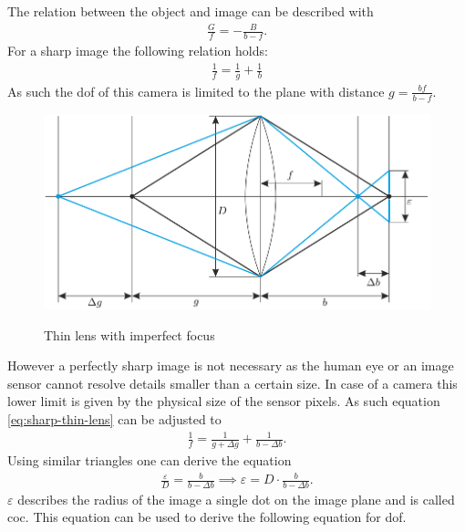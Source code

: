 The relation between the object and image can be described with
\begin{align}
    \frac{G}{f} = - \frac{B}{b-f}.
\end{align}
For a sharp image the following relation holds:
\begin{align}
    \frac{1}{f} = \frac{1}{g} + \frac{1}{b}
    \label{eq:sharp-thin-lens}
\end{align}
As such the \gls{dof} of this camera is limited to the plane with distance $g = \frac{bf}{b-f}$.
\begin{figure}[h]
    \centering
    \includegraphics[width=\textwidth]{images/coc.png}
    \caption{Thin lens with imperfect focus}
    \label{fig:coc-thin-lens}
    \cite{Beyerer.2016}
\end{figure}
However a perfectly sharp image is not necessary as the human eye or an image sensor cannot resolve details smaller than a certain size.
In case of a camera this lower limit is given by the physical size of the sensor pixels.
As such equation \ref{eq:sharp-thin-lens} can be adjusted to
\begin{align}
    \frac{1}{f} = \frac{1}{g + \Delta g} + \frac{1}{b - \Delta b}.
\end{align}
Using similar triangles one can derive the equation
\begin{align}
    \frac{\varepsilon}{D} = \frac{b}{b - \Delta b} \implies \varepsilon = D \cdot \frac{b}{b - \Delta b}.
    \label{eq:coc}
\end{align}
$\varepsilon$ describes the radius of the image a single dot on the image plane and is called \gls{coc}.
This equation can be used to derive the following equation for \gls{dof}.
